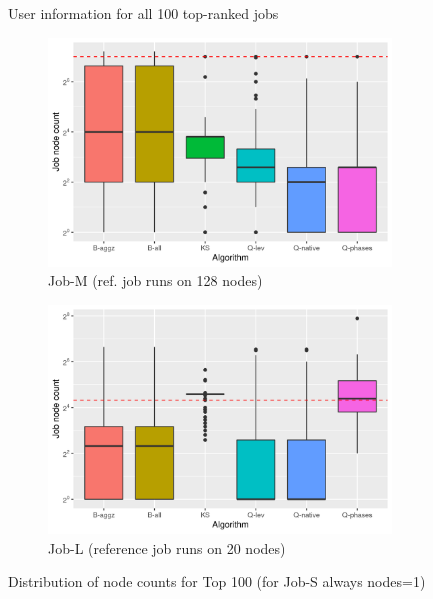 \documentclass{jhps}
\begin{document}
\begin{figure}[bt]
\caption{User information for all 100 top-ranked jobs}
\label{fig:userids}
\end{figure}

\begin{figure}
\begin{subfigure}{0.48\textwidth}
\centering
\includegraphics[width=\textwidth]{job_similarities_5024292-out/jobs-nodes}
\caption{Job-M (ref. job runs on 128 nodes)}\label{fig:nodes-job-M}
\end{subfigure}
\begin{subfigure}{0.48\textwidth}
\centering
\includegraphics[width=\textwidth]{job_similarities_7488914-out/jobs-nodes}
\caption{Job-L (reference job runs on 20 nodes)}\label{fig:nodes-job-L}
\end{subfigure}
\centering
\caption{Distribution of node counts for Top 100 (for Job-S always nodes=1)}%
\label{fig:nodes-job}
\end{figure}
\end{document}
